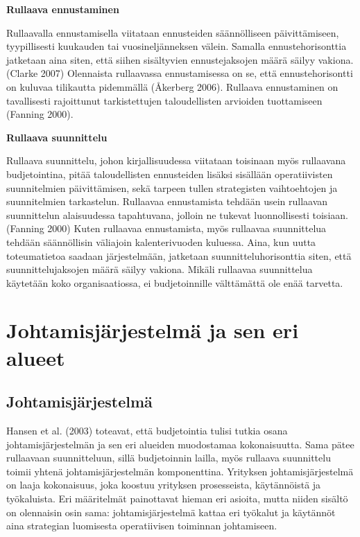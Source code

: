 \documentclass[12pt,a4paper,oneside,pdftex]{report}
\begin{document}
\textbf{Rullaava ennustaminen}

Rullaavalla ennustamisella viitataan ennusteiden säännölliseen päivittämiseen, tyypillisesti kuukauden tai vuosineljänneksen välein. Samalla ennustehorisonttia jatketaan aina siten, että siihen sisältyvien ennustejaksojen määrä säilyy vakiona. (Clarke 2007) Olennaista rullaavassa ennustamisessa on se, että ennustehorisontti on kuluvaa tilikautta pidemmällä (Åkerberg 2006). Rullaava ennustaminen on tavallisesti rajoittunut tarkistettujen taloudellisten arvioiden tuottamiseen (Fanning 2000).

\textbf{Rullaava suunnittelu}

Rullaava suunnittelu, johon kirjallisuudessa viitataan toisinaan myös rullaavana budjetointina, pitää taloudellisten ennusteiden lisäksi sisällään operatiivisten suunnitelmien päivittämisen, sekä tarpeen tullen strategisten vaihtoehtojen ja suunnitelmien tarkastelun. Rullaavaa ennustamista tehdään usein rullaavan suunnittelun alaisuudessa tapahtuvana, jolloin ne tukevat luonnollisesti toisiaan. (Fanning 2000) Kuten rullaavaa ennustamista, myös rullaavaa suunnittelua tehdään säännöllisin väliajoin kalenterivuoden kuluessa. Aina, kun uutta toteumatietoa saadaan järjestelmään, jatketaan suunnitteluhorisonttia siten, että suunnittelujaksojen määrä säilyy vakiona. Mikäli rullaavaa suunnittelua käytetään koko organisaatiossa, ei budjetoinnille välttämättä ole enää tarvetta.

\chapter{Johtamisjärjestelmä ja sen eri alueet}
\label{chapter:johtamisjärjestelmä}

\section{Johtamisjärjestelmä}

Hansen et al. (2003) toteavat, että budjetointia tulisi tutkia osana johtamisjärjestelmän ja sen eri alueiden muodostamaa kokonaisuutta. Sama pätee rullaavaan suunnitteluun, sillä budjetoinnin lailla, myös rullaava suunnittelu toimii yhtenä johtamisjärjestelmän komponenttina. Yrityksen johtamisjärjestelmä on laaja kokonaisuus, joka koostuu yrityksen prosesseista, käytännöistä ja työkaluista. Eri määritelmät painottavat hieman eri asioita, mutta niiden sisältö on olennaisin osin sama: johtamisjärjestelmä kattaa eri työkalut ja käytännöt aina strategian luomisesta operatiivisen toiminnan johtamiseen.
\end{document}
